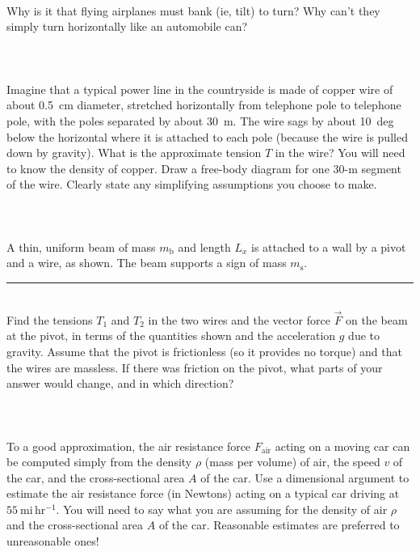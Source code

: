 \documentclass[12pt]{article}
\newcounter{problem}
\begin{document}
\paragraph{\problemname~\theproblem}

Why is it that flying airplanes must bank (ie, tilt) to turn?  Why
can't they simply turn horizontally like an automobile can?

\paragraph{\problemname~\theproblem}

Imagine that a typical power line in the countryside is made of copper
wire of about 0.5~cm diameter, stretched horizontally from telephone
pole to telephone pole, with the poles separated by about 30~m.  The
wire sags by about 10~deg below the horizontal where it is attached to
each pole (because the wire is pulled down by gravity).  What is the
approximate tension $T$ in the wire?  You will need to know the
density of copper.  Draw a free-body diagram for one 30-m segment of
the wire.  Clearly state any simplifying assumptions you choose to
make.

\paragraph{\problemname~\theproblem}

A thin, uniform beam of mass $m_\mathrm{b}$ and length $L_x$ is
attached to a wall by a pivot and a wire, as shown.  The beam supports
a sign of mass $m_\mathrm{s}$.
\\ \rule{0.35\textwidth}{0pt}
\\
Find the tensions $T_1$ and $T_2$ in the two wires and the vector
force $\vec{F}$ on the beam at the pivot, in terms of the quantities
shown and the acceleration $g$ due to gravity.  Assume that the pivot
is frictionless (so it provides no torque) and that the wires are
massless.  If there was friction on the pivot, what parts of your
answer would change, and in which direction?

\paragraph{\problemname~\theproblem}

To a good approximation, the air resistance force $F_\mathrm{air}$
acting on a moving car can be computed simply from the density $\rho$
(mass per volume) of air, the speed $v$ of the car, and the
cross-sectional area $A$ of the car.  Use a dimensional argument to
estimate the air resistance force (in Newtons) acting on a typical car
driving at $55~\mathrm{mi\,hr^{-1}}$.  You will need to say what you
are assuming for the density of air $\rho$ and the cross-sectional
area $A$ of the car.  Reasonable estimates are preferred to
unreasonable ones!
\end{document}
